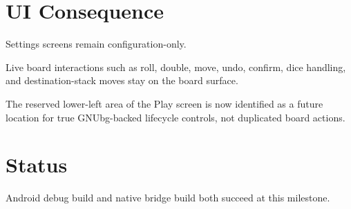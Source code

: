 \documentclass[11pt,a4paper]{article}
\begin{document}
\section*{UI Consequence}

Settings screens remain configuration-only.

Live board interactions such as roll, double, move, undo, confirm, dice handling, and destination-stack moves stay on the board surface.

The reserved lower-left area of the Play screen is now identified as a future location for true GNUbg-backed lifecycle controls, not duplicated board actions.

\section*{Status}

Android debug build and native bridge build both succeed at this milestone.
\end{document}
